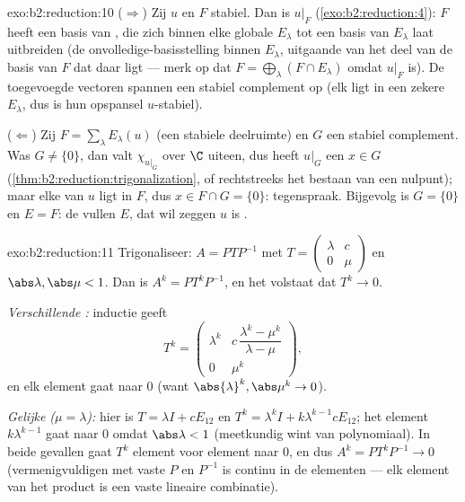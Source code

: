 \begin{solution}{exo:b2:reduction:10}
($\Rightarrow$) Zij $u$  en $F$ stabiel. Dan is
$u|_F$  (\cref{exo:b2:reduction:4}): $F$ heeft een
basis van , die zich binnen elke globale 
$E_\lambda$ tot een basis van $E_\lambda$ laat uitbreiden (de
onvolledige-basisstelling binnen $E_\lambda$, uitgaande van het deel
van de basis van $F$ dat daar ligt --- merk op dat $F =
\bigoplus_\lambda (F \cap E_\lambda)$ omdat $u|_F$
 is). De toegevoegde vectoren spannen een stabiel
complement op (elk ligt in een zekere $E_\lambda$, dus is hun
opspansel $u$-stabiel).

($\Leftarrow$) Zij $F = \sum_\lambda E_\lambda(u)$ (een stabiele
deelruimte) en $G$ een stabiel complement. Was $G \neq \{0\}$, dan
valt $\chi_{u|_G}$ over $\C$ uiteen, dus heeft $u|_G$ een
 $x \in G$
(\cref{thm:b2:reduction:trigonalization}, of rechtstreeks het
bestaan van een nulpunt); maar elke  van $u$ ligt in
$F$, dus $x \in F \cap G = \{0\}$: tegenspraak. Bijgevolg is $G =
\{0\}$ en $E = F$: de  vullen $E$, dat wil zeggen $u$
is .
\end{solution}

\begin{solution}{exo:b2:reduction:11}
Trigonaliseer: $A = PTP^{-1}$ met $T = \begin{pmatrix} \lambda &
c\\ 0 & \mu\end{pmatrix}$ en $\abs\lambda, \abs\mu < 1$. Dan is
$A^k = PT^kP^{-1}$, en het volstaat dat $T^k \to 0$.

\emph{Verschillende :} inductie geeft
\[
T^k = \begin{pmatrix}
\lambda^k & c\,\dfrac{\lambda^k - \mu^k}{\lambda - \mu}\\[4pt]
0 & \mu^k
\end{pmatrix},
\]
en elk element gaat naar $0$ (want $\abs{\lambda}^k, \abs\mu^k \to
0$).

\emph{Gelijke  ($\mu = \lambda$):} hier is $T = \lambda
I + cE_{12}$ en $T^k = \lambda^k I + k\lambda^{k-1}cE_{12}$; het
element $k\lambda^{k-1}$ gaat naar $0$ omdat $\abs\lambda < 1$
(meetkundig wint van polynomiaal). In beide gevallen gaat $T^k$
element voor element naar $0$, en dus $A^k = PT^kP^{-1} \to 0$
(vermenigvuldigen met vaste $P$ en $P^{-1}$ is continu in de
elementen --- elk element van het product is een vaste lineaire
combinatie).
\end{solution}

